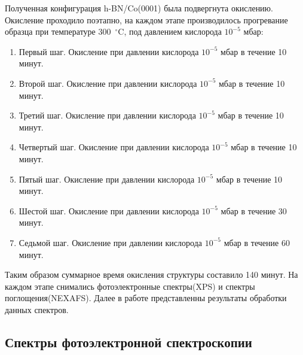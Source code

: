 Полученная конфигурация h-BN/Co(0001) была подвергнута окислению. Окисление проходило 
поэтапно, на каждом этапе производилось прогревание образца при температуре 300~$^\circ$C,
под давлением кислорода $10^{-5}$ мбар:
\begin{enumerate}
	\item Первый шаг. Окисление при давлении кислорода $10^{-5}$ мбар в течение 10 минут.
	\item Второй шаг. Окисление при давлении кислорода $10^{-5}$ мбар в течение 10 минут.
	\item Третий шаг. Окисление при давлении кислорода $10^{-5}$ мбар в течение 10 минут.
	\item Четвертый шаг. Окисление при давлении кислорода $10^{-5}$ мбар в течение 10 минут.
	\item Пятый шаг. Окисление при давлении кислорода $10^{-5}$ мбар в течение 10 минут.
	\item Шестой шаг. Окисление при давлении кислорода $10^{-5}$ мбар в течение 30 минут.
	\item Седьмой шаг. Окисление при давлении кислорода $10^{-5}$ мбар в течение 60 минут.
\end{enumerate}
Таким образом суммарное время окисления структуры составило 140 минут.
На каждом этапе снимались фотоэлектронные спектры(XPS) и спектры поглощения(NEXAFS).
Далее в работе представленны результаты обработки данных спектров.

\subsection{Спектры фотоэлектронной спектроскопии}

